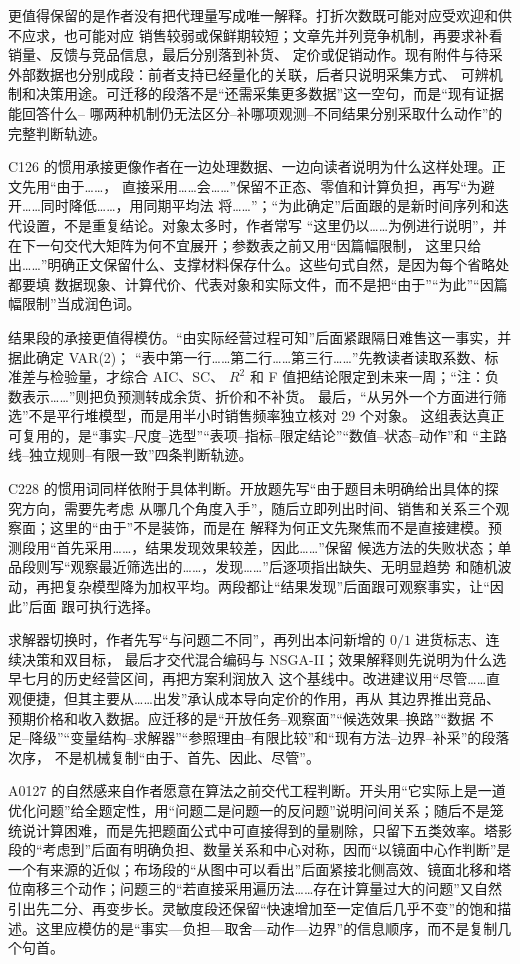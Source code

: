 更值得保留的是作者没有把代理量写成唯一解释。打折次数既可能对应受欢迎和供不应求，也可能对应
销售较弱或保鲜期较短；文章先并列竞争机制，再要求补看销量、反馈与竞品信息，最后分别落到补货、
定价或促销动作。现有附件与待采外部数据也分别成段：前者支持已经量化的关联，后者只说明采集方式、
可辨机制和决策用途。可迁移的段落不是“还需采集更多数据”这一空句，而是“现有证据能回答什么--
哪两种机制仍无法区分--补哪项观测--不同结果分别采取什么动作”的完整判断轨迹。

C126 的惯用承接更像作者在一边处理数据、一边向读者说明为什么这样处理。正文先用“由于……，
直接采用……会……”保留不正态、零值和计算负担，再写“为避开……同时降低……，用同期平均法
将……”；“为此确定”后面跟的是新时间序列和迭代设置，不是重复结论。对象太多时，作者常写
“这里仍以……为例进行说明”，并在下一句交代大矩阵为何不宜展开；参数表之前又用“因篇幅限制，
这里只给出……”明确正文保留什么、支撑材料保存什么。这些句式自然，是因为每个省略处都要填
数据现象、计算代价、代表对象和实际文件，而不是把“由于”“为此”“因篇幅限制”当成润色词。

结果段的承接更值得模仿。“由实际经营过程可知”后面紧跟隔日难售这一事实，并据此确定 VAR(2)；
“表中第一行……第二行……第三行……”先教读者读取系数、标准差与检验量，才综合 AIC、SC、
$R^2$ 和 F 值把结论限定到未来一周；“注：负数表示……”则把负预测转成余货、折价和不补货。
最后，“从另外一个方面进行筛选”不是平行堆模型，而是用半小时销售频率独立核对 29 个对象。
这组表达真正可复用的，是“事实--尺度--选型”“表项--指标--限定结论”“数值--状态--动作”和
“主路线--独立规则--有限一致”四条判断轨迹。

C228 的惯用词同样依附于具体判断。开放题先写“由于题目未明确给出具体的探究方向，需要先考虑
从哪几个角度入手”，随后立即列出时间、销售和关系三个观察面；这里的“由于”不是装饰，而是在
解释为何正文先聚焦而不是直接建模。预测段用“首先采用……，结果发现效果较差，因此……”保留
候选方法的失败状态；单品段则写“观察最近筛选出的……，发现……”后逐项指出缺失、无明显趋势
和随机波动，再把复杂模型降为加权平均。两段都让“结果发现”后面跟可观察事实，让“因此”后面
跟可执行选择。

求解器切换时，作者先写“与问题二不同”，再列出本问新增的 $0/1$ 进货标志、连续决策和双目标，
最后才交代混合编码与 NSGA-II；效果解释则先说明为什么选早七月的历史经营区间，再把方案利润放入
这个基线中。改进建议用“尽管……直观便捷，但其主要从……出发”承认成本导向定价的作用，再从
其边界推出竞品、预期价格和收入数据。应迁移的是“开放任务--观察面”“候选效果--换路”“数据
不足--降级”“变量结构--求解器”“参照理由--有限比较”和“现有方法--边界--补采”的段落次序，
不是机械复制“由于、首先、因此、尽管”。

A0127 的自然感来自作者愿意在算法之前交代工程判断。开头用“它实际上是一道优化问题”给全题定性，用“问题二是问题一的反问题”说明问间关系；随后不是笼统说计算困难，而是先把题面公式中可直接得到的量剔除，只留下五类效率。塔影段的“考虑到”后面有明确负担、数量关系和中心对称，因而“以镜面中心作判断”是一个有来源的近似；布场段的“从图中可以看出”后面紧接北侧高效、镜面北移和塔位南移三个动作；问题三的“若直接采用遍历法……存在计算量过大的问题”又自然引出先二分、再变步长。灵敏度段还保留“快速增加至一定值后几乎不变”的饱和描述。这里应模仿的是“事实—负担—取舍—动作—边界”的信息顺序，而不是复制几个句首。

